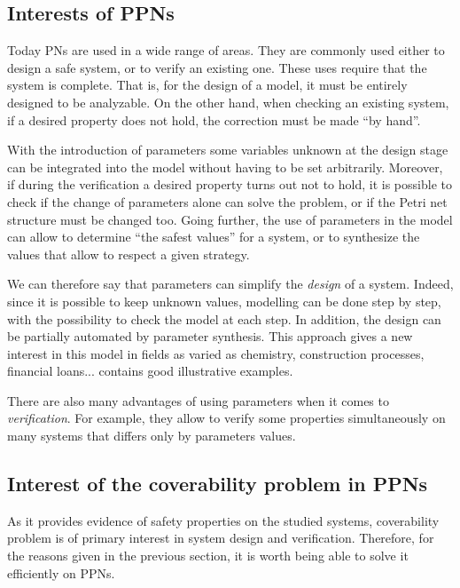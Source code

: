 \subsection{Interests of \acp{PPN}}


Today \acp{PN} are used in a wide range of areas.
They are commonly used either to design a safe system, or to verify an existing one.
These uses require that the system is complete.
That is, for the design of a model, it must be entirely designed to be analyzable.
On the other hand, when checking an existing system, if a desired property does not hold, the correction must be made ``by hand''.

With the introduction of parameters some variables unknown at the design stage can be integrated into the model without having to be set arbitrarily. Moreover, if during the verification a desired property turns out not to hold, it is possible to check if the change of parameters alone can solve the problem, or if the Petri net structure must be changed too. Going further, the use of parameters in the model can allow to determine ``the safest values'' for a system, or to synthesize the values that allow to respect a given strategy.

We can therefore say that parameters can simplify the \emph{design} of a system. Indeed, since it is possible to keep unknown values, modelling can be done step by step, with the possibility to check the model at each step.
In addition, the design can be partially automated by parameter synthesis.
This approach gives a new interest in this model in fields as varied as chemistry, construction processes, financial loans...
\cite{David17} contains good illustrative examples.

There are also many advantages of using parameters when it comes to \emph{verification}.
For example, they allow to verify some properties simultaneously on many systems that differs only by parameters values.

\subsection{Interest of the coverability problem in \acp{PPN}}


As it provides evidence of safety properties on the studied systems, coverability problem is of primary interest in system design and verification. Therefore, for the reasons given in the previous section, it is worth being able to solve it efficiently on \acp{PPN}.

